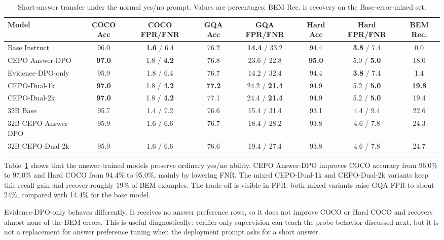 \documentclass[10pt,twocolumn,letterpaper]{article}
\newcommand{\answerdpo}{CEPO Answer-DPO}
\newcommand{\evidencedpo}{Evidence-DPO-only}
\newcommand{\dualonek}{CEPO-Dual-1k}
\newcommand{\dualtwok}{CEPO-Dual-2k}
\begin{document}
\begin{table}[t]
\centering
\scriptsize
\setlength{\tabcolsep}{3.2pt}
\begin{tabular}{@{}lccccccc@{}}
\toprule
Model & COCO Acc & COCO FPR/FNR & GQA Acc & GQA FPR/FNR & Hard Acc & Hard FPR/FNR & BEM Rec. \\
\midrule
Base Instruct & 96.0 & \textbf{1.6} / 6.4 & 76.2 & \textbf{14.4} / 33.2 & 94.4 & \textbf{3.8} / 7.4 & 0.0 \\
\answerdpo{} & \textbf{97.0} & 1.8 / \textbf{4.2} & 76.8 & 23.6 / 22.8 & \textbf{95.0} & 5.0 / \textbf{5.0} & 18.0 \\
\evidencedpo{} & 95.9 & 1.8 / 6.4 & 76.7 & 14.2 / 32.4 & 94.4 & \textbf{3.8} / 7.4 & 1.4 \\
\dualonek{} & \textbf{97.0} & 1.8 / \textbf{4.2} & \textbf{77.2} & 24.2 / \textbf{21.4} & 94.9 & 5.2 / \textbf{5.0} & \textbf{19.8} \\
\dualtwok{} & \textbf{97.0} & 1.8 / \textbf{4.2} & 77.1 & 24.4 / \textbf{21.4} & 94.9 & 5.2 / \textbf{5.0} & 19.4 \\
\midrule
32B Base & 95.7 & 1.4 / 7.2 & 76.6 & 15.4 / 31.4 & 93.1 & 4.4 / 9.4 & 22.6 \\
32B \answerdpo{} & 95.9 & 1.6 / 6.6 & 76.7 & 18.4 / 28.2 & 93.8 & 4.6 / 7.8 & 24.3 \\
32B \dualtwok{} & 95.9 & 1.6 / 6.6 & 76.6 & 19.4 / 27.4 & 93.8 & 4.6 / 7.8 & 24.7 \\
\bottomrule
\end{tabular}
\caption{Short-answer transfer under the normal yes/no prompt. Values are
percentages; BEM Rec. is recovery on the Base-error-mined set.}
\label{tab:short}
\end{table}

Table~\ref{tab:short} shows that the answer-trained models preserve ordinary
yes/no ability. \answerdpo{} improves COCO accuracy from 96.0\% to 97.0\% and
Hard COCO from 94.4\% to 95.0\%, mainly by lowering FNR. The mixed
\dualonek{} and \dualtwok{} variants keep this recall gain and recover roughly
19\% of BEM examples. The trade-off is visible in FPR: both mixed variants
raise GQA FPR to about 24\%, compared with 14.4\% for the base model.

\evidencedpo{} behaves differently. It receives no answer preference rows, so
it does not improve COCO or Hard COCO and recovers almost none of the BEM
errors. This is useful diagnostically: verifier-only supervision can teach the
probe behavior discussed next, but it is not a replacement for answer
preference tuning when the deployment prompt asks for a short answer.
\end{document}
